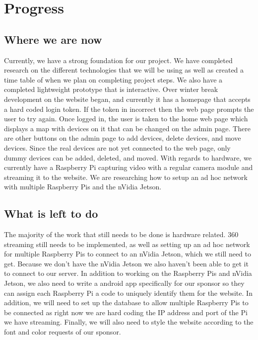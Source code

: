 \documentclass[onecolumn, draftclsnofoot,10pt, compsoc]{IEEEtran}
\begin{document}
\section{Progress}
    \subsection{Where we are now}
        Currently, we have a strong foundation for our project.
        We have completed research on the different technologies that we will be using as well as created a time table of when we plan on completing project steps.
        We also have a completed lightweight prototype that is interactive.
        Over winter break development on the website began, and currently it has a homepage that accepts a hard coded login token. 
        If the token in incorrect then the web page prompts the user to try again. 
        Once logged in, the user is taken to the home web page which displays a map with devices on it that can be changed on the admin page. 
        There are other buttons on the admin page to add devices, delete devices, and move devices. 
        Since the real devices are not yet connected to the web page, only dummy devices can be added, deleted, and moved. 
        With regards to hardware, we currently have a Raspberry Pi capturing video with a regular camera module and streaming it to the website. 
        We are researching how to setup an ad hoc network with multiple Raspberry Pis and the nVidia Jetson. 
        

    \subsection{What is left to do}
        The majority of the work that still needs to be done is hardware related. 
        360 streaming still needs to be implemented, as well as setting up an ad hoc network for multiple Raspberry Pis to connect to an nVidia Jetson, which we still need to get. 
        Because we don't have the nVidia Jetson we also haven't been able to get it to connect to our server. 
        In addition to working on the Raspberry Pis and nVidia Jetson, we also need to write a android app specifically for our sponsor so they can assign each Raspberry Pi a code to uniquely identify them for the website.
        In addition, we will need to set up the database to allow multiple Raspberry Pis to be connected as right now we are hard coding the IP address and port of the Pi we have streaming.
        Finally, we will also need to style the website according to the font and color requests of our sponsor.
    
\end{document}
